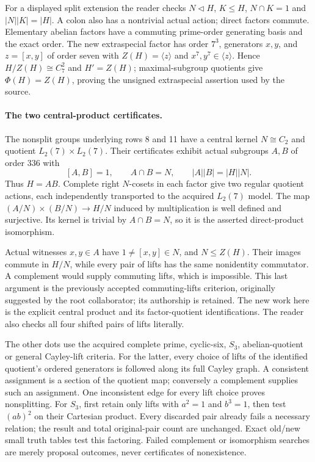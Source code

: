 \documentclass[11pt]{article}
\begin{document}
For a displayed split extension the reader checks $N\triangleleft H$,
$K\leq H$, $N\cap K=1$ and $|N||K|=|H|$. A colon also has a nontrivial
actual action; direct factors commute. Elementary abelian factors have
a commuting prime-order generating basis and the exact order. The new
extraspecial factor has order $7^3$, generators $x,y$, and
$z=[x,y]$ of order seven with $Z(H)=\langle z\rangle$ and
$x^7,y^7\in\langle z\rangle$. Hence $H/Z(H)\cong C_7^2$ and
$H'=Z(H)$; maximal-subgroup quotients give $\Phi(H)=Z(H)$, proving the
unsigned extraspecial assertion used by the source.

\newpage
\paragraph{The two central-product certificates.}
The nonsplit groups underlying rows 8 and 11 have a central kernel
$N\cong C_2$ and quotient $L_2(7)\times L_2(7)$. Their certificates exhibit
actual subgroups $A,B$ of order $336$ with
\[
 [A,B]=1,\qquad A\cap B=N,\qquad |A||B|=|H||N|.
\]
Thus $H=AB$. Complete right $N$-cosets in each factor give two regular
quotient actions, each independently transported to the acquired
$L_2(7)$ model. The map $(A/N)\times(B/N)\to H/N$ induced by multiplication
is well defined and surjective. Its kernel is trivial by $A\cap B=N$,
so it is the asserted direct-product isomorphism.

Actual witnesses $x,y\in A$ have $1\ne[x,y]\in N$, and $N\leq Z(H)$.
Their images commute in $H/N$, while every pair of lifts has the same
nonidentity commutator. A complement would supply commuting lifts, which
is impossible. This last argument is the previously accepted
commuting-lifts criterion, originally suggested by the root collaborator;
its authorship is retained. The new work here is the explicit central
product and its factor-quotient identifications. The reader also checks
all four shifted pairs of lifts literally.

The other dots use the acquired complete prime, cyclic-six, $S_3$,
abelian-quotient or general Cayley-lift criteria. For the latter, every
choice of lifts of the identified quotient's ordered generators is
followed along its full Cayley graph. A consistent assignment is a
section of the quotient map; conversely a complement supplies such an
assignment. One inconsistent edge for every lift choice proves
nonsplitting. For $S_3$, first retain only lifts with $a^2=1$ and $b^3=1$,
then test $(ab)^2$ on their Cartesian product. Every discarded pair already
fails a necessary relation; the result and total original-pair count are
unchanged. Exact old/new small truth tables test this factoring. Failed
complement or isomorphism searches are merely proposal outcomes, never
certificates of nonexistence.
\end{document}
